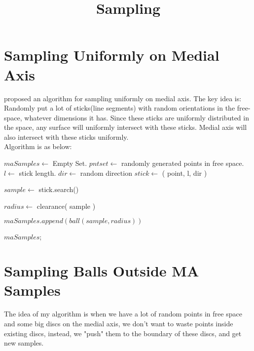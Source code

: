\documentclass[12pt]{article}
\title{Sampling}
\date{}
\begin{document}
  \maketitle
  
  \section{Sampling Uniformly on Medial Axis}
  \cite{jory} proposed an algorithm for sampling uniformly on medial axis. The key idea is: Randomly put a lot of sticks(line segments) with random orientations in the free-space, whatever dimensions it has. Since these sticks are uniformly distributed in the space, any surface will uniformly intersect with these sticks. Medial axis will also intersect with these sticks uniformly.\\
  
  Algorithm is as below:\\
  
  \begin{algorithmic}
    \State $maSamples \gets$ Empty Set.
    \State $pntset \gets$ randomly generated points in free space.
    \State $l \gets $ stick length.	 
		\State $dir \gets$ random direction  
		\State $stick \gets$ ( point, l, dir ) 
		
			$sample \gets$ stick.search()
			
			$radius \gets$ clearance( sample ) 
			
			$maSamples.append( ball(sample, radius) )$
		\EndIf
	\EndFor
	
	\noindent \Return $maSamples$;
  \end{algorithmic}
 
  \section{Sampling Balls Outside MA Samples }
  
  The idea of my algorithm is when we have a lot of random points in free space and some big discs on the medial axis, we don't want to waste points inside existing discs, instead, we "push" them to the boundary of these discs, and get new samples.
  
\end{document}
